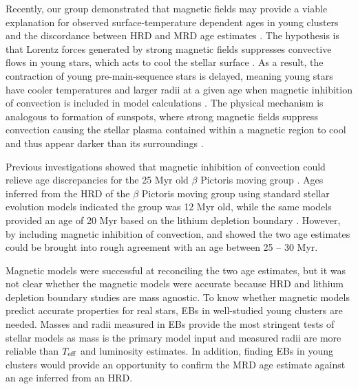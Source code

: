 %
%

Recently, our group demonstrated that magnetic fields may provide a viable explanation for observed surface-temperature dependent ages in young clusters and the discordance between HRD and MRD age estimates \citep[see Figure~\ref{fig:usco};][]{Feiden2016}. The hypothesis is that Lorentz forces generated by strong magnetic fields suppresses convective flows in young stars, which acts to cool the stellar surface \citep[e.g.,][]{DAntona2000, MM01, FC12b}. As a result, the contraction of young pre-main-sequence stars is delayed, meaning young stars have cooler temperatures and larger radii at a given age when magnetic inhibition of convection is included in model calculations \citep{MM10, Feiden2016}. The physical mechanism is analogous to formation of sunspots, where strong magnetic fields suppress convection causing the stellar plasma contained within a magnetic region to cool and thus appear darker than its surroundings \citep{Biermann1941, Deinzer1965}.

Previous investigations showed that magnetic inhibition of convection could relieve age discrepancies for the 25 Myr old $\beta$ Pictoris moving group \citep{MM10, Malo2014}. Ages inferred from the HRD of the $\beta$ Pictoris moving group using standard stellar evolution models indicated the group was 12 Myr old, while the same models provided an age of 20 Myr based on the lithium depletion boundary \citep{Someone2005, Binks2013}. However, by including magnetic inhibition of convection, \citet{MM10} and \citet{Malo2014} showed the two age estimates could be brought into rough agreement with an age between 25 -- 30 Myr. 

Magnetic models were successful at reconciling the two age estimates, but it was not clear whether the magnetic models were accurate because HRD and lithium depletion boundary studies are mass agnostic. To know whether magnetic models predict accurate properties for real stars, EBs in well-studied young clusters are needed. Masses and radii measured in EBs provide the most stringent tests of stellar models as mass is the primary model input and measured radii are more reliable than $T_{\rm eff}$ and luminosity estimates. In addition, finding EBs in young clusters would provide an opportunity to confirm the MRD age estimate against an age inferred from an HRD.

